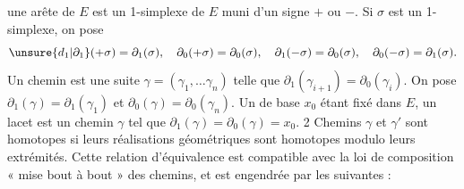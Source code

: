  une arête de $E$ est un 1-simplexe de $E$ muni d'un signe $+$ ou $-$. Si $\sigma$ est un 1-simplexe, on pose
\[
\unsure{d_1|\partial_1}(+\sigma)=\partial_1(\sigma),\quad
\partial_0(+\sigma)=\partial_0(\sigma),\quad
\partial_1(-\sigma)=\partial_0(\sigma),\quad
\partial_0(-\sigma)=\partial_1(\sigma).
\]
Un chemin est une suite $\gamma=(\gamma_1,\ldots\gamma_n)$ telle que $\partial_1(\gamma_{i+1})=\partial_0(\gamma_i)$. On pose $\partial_1(\gamma)=\partial_1(\gamma_1)$ et $\partial_0(\gamma)=\partial_0(\gamma_n)$. Un  de base $x_0$ étant fixé dans $E$, un lacet est un chemin $\gamma$ tel que $\partial_1(\gamma)=\partial_0(\gamma)=x_0$. 2 Chemins $\gamma$ et $\gamma'$ sont homotopes si leurs réalisations géométriques sont homotopes modulo leurs extrémités. Cette relation d'équivalence est compatible avec la loi de composition « mise bout à bout » des chemins, et est engendrée par les suivantes :

